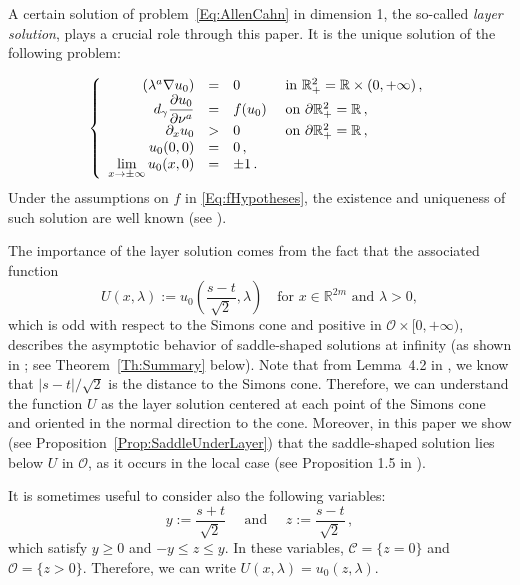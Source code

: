 \documentclass[twoside,leqno,symbols-for-thanks, draft]{rmi}
\numberwithin{equation}{section}
\theoremstyle{definition}
\newcommand{\con}[1]{\mathbb{#1}}
\newcommand{\R}{\con{R}} %
\newcommand{\ccal}{\mathscr{C}}
\newcommand{\ocal}{\mathcal{O}}
\newcommand{\s}{\gamma}
\newcommand\beqc[1]{\left\{\begin{array}{#1}}
\newcommand\eeqc{\end{array} \right.}
\def\PDEsystem{rcll}
\let\div\relax
\DeclareMathOperator{\div}{div}
\def\ds{\displaystyle}
\begin{document}
A certain solution of problem~\eqref{Eq:AllenCahn} in dimension 1, the so-called \emph{layer solution}, plays a crucial role through this paper. It is the unique solution of the following problem:

\begin{equation}
\label{Eq:LayerSolution}
\beqc{\PDEsystem}
\div(\lambda^a \nabla u_0) &=& 0 & \textrm{ in } \R^{2}_+ = \R \times (0, +\infty)\,, \\
d_\s \dfrac{\partial u_0}{\partial \nu^a} &=& f(u_0) & \textrm{ on } \partial \R^{2}_+ = \R\,,\\
\partial_x u_0 &>& 0 & \textrm{ on } \partial \R^{2}_+ = \R\,,\\
u_0 (0,0) &=& 0 \,,\\
\ds \lim_{x\to\pm \infty} u_0 (x,0) &=& \pm 1\,.
\eeqc
\end{equation}
Under the assumptions on $f$ in \eqref{Eq:fHypotheses}, the existence and uniqueness of such solution are well known (see \cite{CabreSireI}).

The importance of the layer solution comes from the fact that the associated function
\begin{equation}
\label{Eq:DefULayer}
U(x,\lambda) := u_0\left( \frac{s-t}{\sqrt{2}},\lambda \right) \ \ \ \text{ for } x\in\R^{2m} \text{ and } \lambda>0,
\end{equation}
which is odd with respect to the Simons cone and positive in $\ocal\times [0,+\infty)$, describes the asymptotic behavior of saddle-shaped solutions at infinity (as shown in \cite{Cinti-Saddle, Cinti-Saddle2}; see Theorem~\ref{Th:Summary} below).  Note that from Lemma~4.2 in \cite{CabreTerraI}, we know that $|s-t|/\sqrt{2}$ is the distance to the Simons cone. Therefore, we can understand the function $U$ as the layer solution centered at each point of the Simons cone and oriented in the normal direction to the cone. Moreover, in this paper we  show (see Proposition~\ref{Prop:SaddleUnderLayer}) that the saddle-shaped solution lies below $U$ in $\ocal$, as it occurs in the local case (see Proposition 1.5 in \cite{CabreTerraI}).

It is sometimes useful to consider also the following variables:
$$
y := \dfrac{s+t}{\sqrt{2}} \quad \text{ and } \quad z := \dfrac{s-t}{\sqrt{2}} \,,
$$
which satisfy $y\geq 0$ and $-y \leq z \leq y$. In these variables, $\ccal = \{ z = 0\}$ and $\ocal = \{ z > 0\}$. Therefore, we can write $U(x,\lambda) = u_0(z, \lambda)$.
\end{document}
